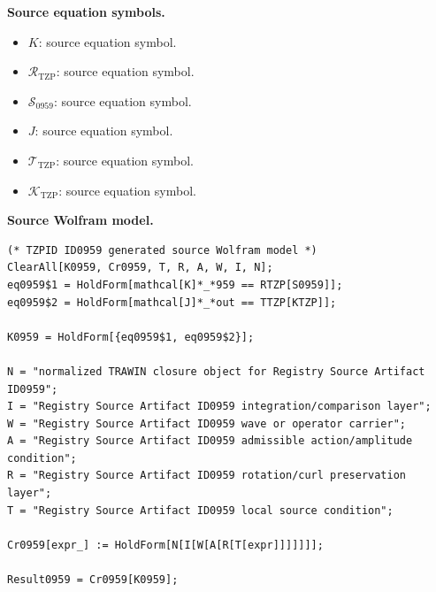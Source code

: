 \begin{minipage}[t]{0.49\linewidth}
\begingroup
\small
\raggedright
\textbf{Source equation symbols.}\par
\begin{itemize}[leftmargin=1.35em,itemsep=1pt,topsep=1pt,parsep=0pt]
    \item $K$: source equation symbol.
    \item $\mathcal{R}_{\mathrm{TZP}}$: source equation symbol.
    \item $\mathcal{S}_{0959}$: source equation symbol.
    \item $J$: source equation symbol.
    \item $\mathcal{T}_{\mathrm{TZP}}$: source equation symbol.
    \item $\mathcal{K}_{\mathrm{TZP}}$: source equation symbol.
\end{itemize}
\endgroup
\end{minipage}\hfill
\begin{minipage}[t]{0.47\linewidth}
\begingroup
\scriptsize
\raggedright
\textbf{Source Wolfram model.}\par
\begin{Verbatim}[fontsize=\tiny,breaklines=true,breakanywhere=true]
(* TZPID ID0959 generated source Wolfram model *)
ClearAll[K0959, Cr0959, T, R, A, W, I, N];
eq0959$1 = HoldForm[mathcal[K]*_*959 == RTZP[S0959]];
eq0959$2 = HoldForm[mathcal[J]*_*out == TTZP[KTZP]];

K0959 = HoldForm[{eq0959$1, eq0959$2}];

N = "normalized TRAWIN closure object for Registry Source Artifact ID0959";
I = "Registry Source Artifact ID0959 integration/comparison layer";
W = "Registry Source Artifact ID0959 wave or operator carrier";
A = "Registry Source Artifact ID0959 admissible action/amplitude condition";
R = "Registry Source Artifact ID0959 rotation/curl preservation layer";
T = "Registry Source Artifact ID0959 local source condition";

Cr0959[expr_] := HoldForm[N[I[W[A[R[T[expr]]]]]]];

Result0959 = Cr0959[K0959];
\end{Verbatim}
\endgroup
\end{minipage}


